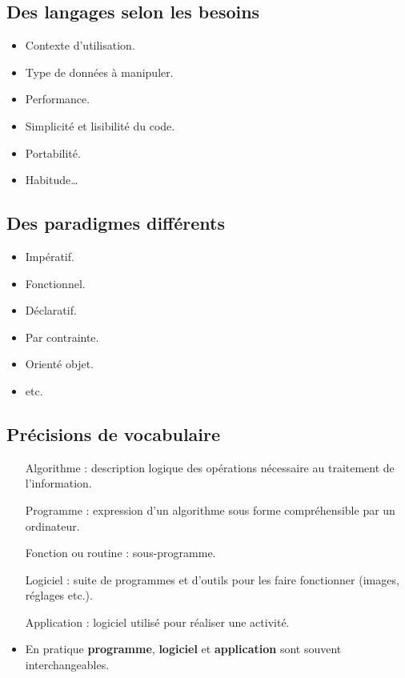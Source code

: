 \subsection{Des langages selon les besoins}
\begin{slide}
	\begin{itemize}
		\item Contexte d'utilisation.
		\item Type de données à manipuler.
		\item Performance.
		\item Simplicité et lisibilité du code.
		\item Portabilité.
		\item Habitude… 
	\end{itemize}
\end{slide}


\subsection{Des paradigmes différents}
\begin{slide}
	\begin{itemize}
		\item Impératif.
		\item Fonctionnel.
		\item Déclaratif.
		\item Par contrainte.
		\item Orienté objet.
		\item etc.
	\end{itemize}
\end{slide}



\subsection{Précisions de vocabulaire}
\begin{slide}
	\small
	\begin{itemize}
		\small
	  \item[Algorithme] : description logique des opérations nécessaire au traitement de l'information.
		\item[Programme] : expression d'un algorithme sous forme compréhensible par un ordinateur.
		\item[Fonction ou routine] : sous-programme.
		\item[Logiciel] : suite de programmes et d'outils pour les faire fonctionner (images, réglages etc.).
		\item[Application] : logiciel utilisé pour réaliser une activité. %
		\item En pratique \textbf{programme}, \textbf{logiciel} et \textbf{application} sont souvent interchangeables.
	\end{itemize}

\end{slide}
